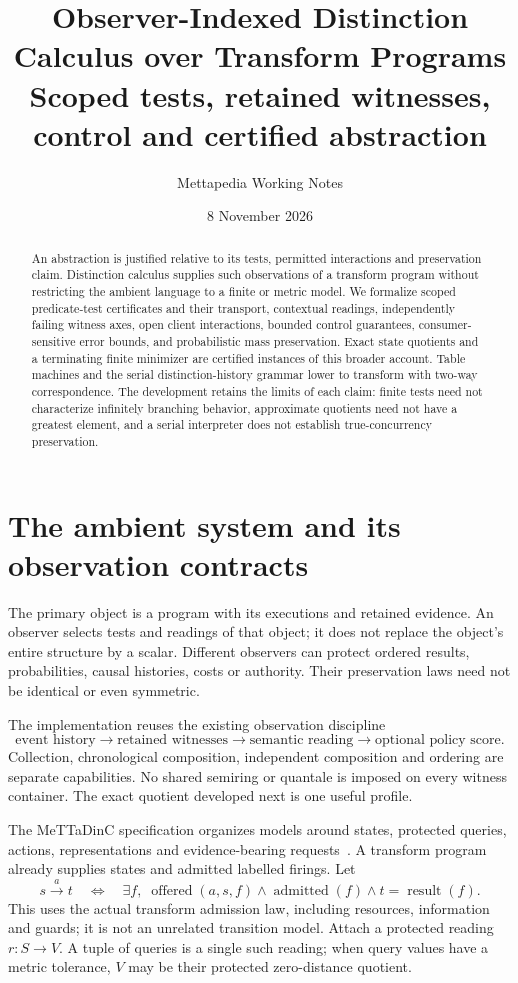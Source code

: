 \documentclass[11pt]{article}
\title{Observer-Indexed Distinction Calculus over Transform Programs\\
\large Scoped tests, retained witnesses, control and certified abstraction}
\author{Mettapedia Working Notes}
\date{8 November 2026}
\begin{document}
\maketitle
\begin{abstract}
An abstraction is justified relative to its tests, permitted interactions and
preservation claim. Distinction calculus supplies such observations of a
transform program without restricting the ambient language to a finite or
metric model. We formalize scoped predicate-test certificates and their
transport, contextual readings, independently failing witness axes, open
client interactions, bounded control guarantees, consumer-sensitive error
bounds, and probabilistic mass preservation. Exact state quotients and a
terminating finite minimizer are certified instances of this broader account.
Table machines and the serial distinction-history grammar lower to transform
with two-way correspondence. The development retains the limits of each
claim: finite tests need not characterize infinitely branching behavior,
approximate quotients need not have a greatest element, and a serial
interpreter does not establish true-concurrency preservation.
\end{abstract}

\section{The ambient system and its observation contracts}
The primary object is a program with its executions and retained evidence.
An observer selects tests and readings of that object; it does not replace
the object's entire structure by a scalar. Different observers can protect
ordered results, probabilities, causal histories, costs or authority. Their
preservation laws need not be identical or even symmetric.

The implementation reuses the existing observation discipline
\[
\text{event history}\longrightarrow\text{retained witnesses}
\longrightarrow\text{semantic reading}\longrightarrow\text{optional policy score}.
\]
Collection, chronological composition, independent composition and ordering
are separate capabilities. No shared semiring or quantale is imposed on every
witness container. The exact quotient developed next is one useful profile.

The MeTTaDinC specification organizes models around states, protected queries,
actions, representations and evidence-bearing requests~\cite{spec}. A transform
program already supplies states and admitted labelled firings. Let
\[
  s\xrightarrow{a}t
  \quad\Longleftrightarrow\quad
  \exists f,\;\operatorname{offered}(a,s,f)\land
  \operatorname{admitted}(f)\land t=\operatorname{result}(f).
\]
This uses the actual transform admission law, including resources, information
and guards; it is not an unrelated transition model. Attach a protected reading
$r:S\to V$. A tuple of queries is a single such reading; when query values have
a metric tolerance, $V$ may be their protected zero-distance quotient.
\end{document}
